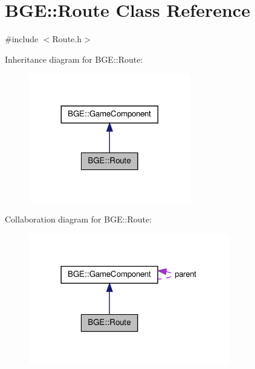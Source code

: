 \hypertarget{class_b_g_e_1_1_route}{\section{B\-G\-E\-:\-:Route Class Reference}
\label{class_b_g_e_1_1_route}
}


{\ttfamily \#include $<$Route.\-h$>$}



Inheritance diagram for B\-G\-E\-:\-:Route\-:
\nopagebreak
\begin{figure}[H]
\begin{center}
\leavevmode
\includegraphics[width=200pt]{class_b_g_e_1_1_route__inherit__graph}
\end{center}
\end{figure}


Collaboration diagram for B\-G\-E\-:\-:Route\-:
\nopagebreak
\begin{figure}[H]
\begin{center}
\leavevmode
\includegraphics[width=249pt]{class_b_g_e_1_1_route__coll__graph}
\end{center}
\end{figure}
